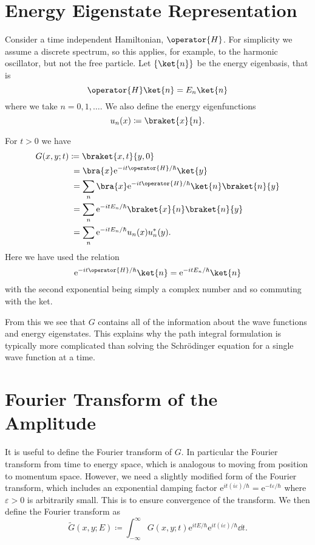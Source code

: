 \documentclass[fleqn]{NotesClass}
\newcommand*{\e}{\mathrm{e}}
\begin{document}
    \section{Energy Eigenstate Representation}
    Consider a time independent Hamiltonian, \(\operator{H}\).
    For simplicity we assume a discrete spectrum, so this applies, for example, to the harmonic oscillator, but not the free particle.
    Let \(\{\ket{n}\}\) be the energy eigenbasis, that is
    \begin{equation}
        \operator{H}\ket{n} = E_n\ket{n}
    \end{equation}
    where we take \(n = 0, 1, \dotsc\).
    We also define the energy eigenfunctions
    \begin{equation}
        u_n(x) \coloneqq \braket{x}{n}.
    \end{equation}
    
    For \(t > 0\) we have
    \begin{align}
        G(x, y; t) &\coloneqq \braket{x, t}{y, 0}\\
        &\hphantom{:}= \bra{x} \e^{-it\operator{H}/\hbar}\ket{y}\\
        &\hphantom{:}= \sum_n \bra{x} \e^{-it\operator{H}/\hbar}\ket{n}\braket{n}{y}\\
        &\hphantom{:}= \sum_n \e^{-itE_n/\hbar}\braket{x}{n}\braket{n}{y}\\
        &\hphantom{:}= \sum_n \e^{-itE_n/\hbar} u_n(x)u_n^*(y).
    \end{align}
    Here we have used the relation
    \begin{equation}
        \e^{-it\operator{H}/\hbar}\ket{n} = \e^{-itE_n/\hbar}\ket{n}
    \end{equation}
    with the second exponential being simply a complex number and so commuting with the ket.
    
    From this we see that \(G\) contains all of the information about the wave functions and energy eigenstates.
    This explains why the path integral formulation is typically more complicated than solving the Schr\"odinger equation for a single wave function at a time.
    
    \section{Fourier Transform of the Amplitude}
    It is useful to define the Fourier transform of \(G\).
    In particular the Fourier transform from time to energy space, which is analogous to moving from position to momentum space.
    However, we need a slightly modified form of the Fourier transform, which includes an exponential damping factor \(\e^{it(i\varepsilon)/\hbar} = \e^{-t\varepsilon/\hbar}\) where \(\varepsilon > 0\) is arbitrarily small.
    This is to ensure convergence of the transform.
    We then define the Fourier transform as
    \begin{equation}
        \tilde{G}(x, y; E) \coloneqq \int_{-\infty}^{\infty} G(x, y; t)\e^{itE/\hbar}\e^{it(i\varepsilon)/\hbar} \dd{t}.
    \end{equation}
    
\end{document}
